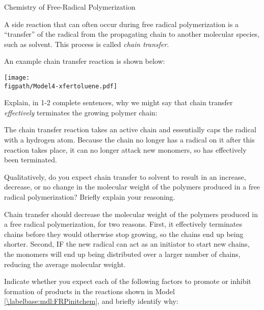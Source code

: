 \begin{activity}{Chemistry of Free-Radical Polymerization}
\begin{model}
	A side reaction that can often occur during free radical polymerization is a ``transfer'' of the radical from the propagating chain to another molecular species, such as solvent.  This process is called \emph{chain transfer}.
	
	An example chain transfer reaction is shown below:
	
			\centerline{\texttt{[image: \\figpath/Model4-xfertoluene.pdf]}}
	
\end{model}

\begin{ctqs}
	\question Explain, in 1-2 complete sentences, why we might say that chain transfer \emph{effectively} terminates the growing polymer chain:
	
		\begin{solution}[1.75in]
			The chain transfer reaction takes an active chain and essentially caps the radical with a hydrogen atom.  Because the chain no longer has a radical on it after this reaction takes place, it can no longer attack new monomers, so has effectively been terminated.
		\end{solution}
	
	\question Qualitatively, do you expect chain transfer to solvent to result in an increase, decrease, or no change in the molecular weight of the polymers produced in a free radical polymerization?  Briefly explain your reasoning.
	
		\begin{solution}[1.75in]
			Chain transfer should decrease the molecular weight of the polymers produced in a free radical polymerization, for two reasons.  First, it effectively terminates chains before they would otherwise stop growing, so the chains end up being shorter.  Second, IF the new radical can act as an initiator to start new chains, the monomers will end up being distributed over a larger number of chains, reducing the average molecular weight.
		\end{solution}
		
\end{ctqs}


\begin{exercises}

	\exercise Indicate whether you expect each of the following factors to promote or inhibit formation of products in the reactions shown in Model \ref{\labelbase:mdl:FRPinitchem}, and briefly identify why: %
	

\end{exercises}
\end{activity}

